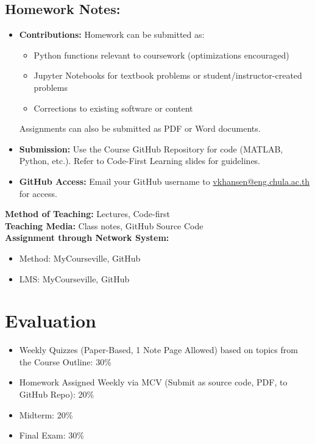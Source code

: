 \documentclass[12pt]{article}
\begin{document}
\begin{enumerate}
\subsection*{Homework Notes:}
\begin{itemize}
    \item \textbf{Contributions:} Homework can be submitted as:
        \begin{itemize}
            \item Python functions relevant to coursework (optimizations encouraged)
            \item Jupyter Notebooks for textbook problems or student/instructor-created problems
            \item Corrections to existing software or content
        \end{itemize}
        Assignments can also be submitted as PDF or Word documents.
    \item \textbf{Submission:} Use the Course GitHub Repository for code (MATLAB, Python, etc.). Refer to Code-First Learning slides for guidelines.
    \item \textbf{GitHub Access:} Email your GitHub username to \href{mailto:vkhansen@eng.chula.ac.th}{vkhansen@eng.chula.ac.th} for access.
\end{itemize}

\textbf{Method of Teaching:} Lectures, Code-first \\
\textbf{Teaching Media:} Class notes, GitHub Source Code \\
\textbf{Assignment through Network System:}
\begin{itemize}
    \item Method: MyCourseville, GitHub
    \item LMS: MyCourseville, GitHub
\end{itemize}

\section*{Evaluation}
\begin{itemize}
    \item Weekly Quizzes (Paper-Based, 1 Note Page Allowed) based on topics from the Course Outline: 30\%
    \item Homework Assigned Weekly via MCV (Submit as source code, PDF, to GitHub Repo): 20\%
    \item Midterm: 20\%
    \item Final Exam: 30\%
\end{itemize}


\end{enumerate}
\end{document}
